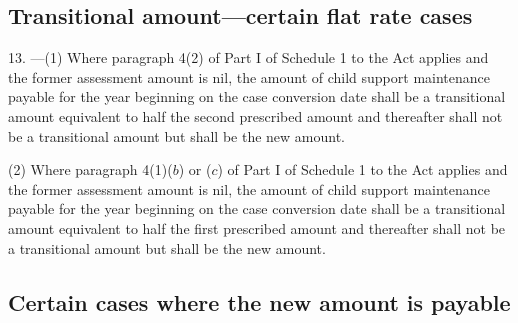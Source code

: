 \documentclass[12pt,a4paper]{article}
\begin{document}

\subsection[13. Transitional amount—certain flat rate cases]{Transitional amount—certain flat rate cases}

13.%
---(1)  %
Where paragraph 4(2) of Part I of Schedule 1 to the Act applies and the former assessment amount is nil, the amount of child support maintenance payable for the year beginning on the case conversion date shall be a transitional amount equivalent to half the second prescribed amount and thereafter shall not be a transitional amount but shall be the new amount.

(2) Where paragraph 4(1)($b$)  or ($c$)  of Part I of Schedule 1 to the Act applies and the former assessment amount is nil, the amount of child support maintenance payable for the year beginning on the case conversion date shall be a transitional amount equivalent to half the first prescribed amount and thereafter shall not be a transitional amount but shall be the new amount.


\subsection[14. Certain cases where the new amount is payable]{Certain cases where the new amount is payable}
\end{document}
